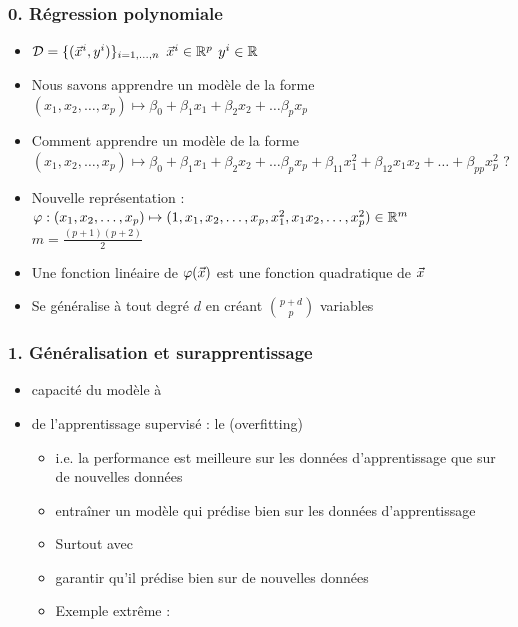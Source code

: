 
\begin{frame}
  \frametitle{0. Régression polynomiale}
  \begin{itemize}
  \item[]
    $\mathcal{D} = \{ (\vec{x}^i, y^i) \}_{i=1, \dots, n}$  \hspace{1em} $\vec{x}^i \in {\mathbb R}^p$ \hspace{0.5em} $y^i \in {\mathbb R}$
  \item Nous savons apprendre un modèle de la forme $(x_1, x_2, \dots, x_p) \mapsto \beta_0 + \beta_1 x_1 + \beta_2 x_2 + \dots \beta_p x_p$ 
  \item Comment apprendre un modèle de la forme $(x_1, x_2, \dots, x_p) \mapsto \beta_0 + \beta_1 x_1 + \beta_2 x_2 + \dots \beta_p x_p + \beta_{11} x_1^2 + \beta_{12} x_1 x_2 + \dots + \beta_{pp} x_p^2$ ?
    \pause
  \item[] Nouvelle représentation : $\varphi: (x_1, x_2, \dots, x_p) \mapsto (1, x_1, x_2, \dots, x_p, x_1^2, x_1x_2, \dots, x_p^2) \in {\mathbb R}^m$ \hspace{0.5em} $m = \frac{(p+1)(p+2)}{2}$
  \item[] Une fonction linéaire de $\varphi(\vec{x})$ est une fonction quadratique de $\vec{x}$ 
  \item Se généralise à tout degré $d$ en créant $\binom{p+d}{p}$ variables 
  \end{itemize}
\end{frame}

\begin{frame}
  \frametitle{1. Généralisation et surapprentissage}
  \begin{itemize}
  \item {} capacité du modèle à 
  \item {} de l'apprentissage supervisé : le  \textcolor{gray!70}{(overfitting)}
    \begin{itemize}
    \item i.e. la performance est meilleure sur les données d'apprentissage que sur de nouvelles données 
    \item {} entraîner un modèle qui prédise bien sur les données d'apprentissage
    \item[] Surtout avec 
    \item {} garantir qu'il prédise bien sur de nouvelles données
    \item[] Exemple extrême : 
    \end{itemize}
  \end{itemize}
\end{frame}

